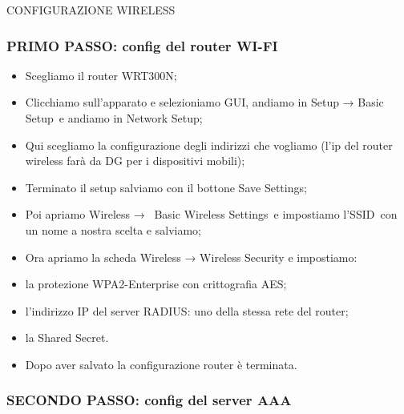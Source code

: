 \documentclass[
]{article}
\providecommand{\tightlist}{%
  \setlength{\itemsep}{0pt}\setlength{\parskip}{0pt}}
\begin{document}
{}

{}

{}

{CONFIGURAZIONE WIRELESS}

{}

{}

\subsubsection{\texorpdfstring{{PRIMO PASSO: config del router
WI-FI}}{PRIMO PASSO: config del router WI-FI}}\label{h.tyjcwt}

{}

\begin{itemize}
\tightlist
\item
  {Scegliamo il router WRT300N;}
\item
  {Clicchiamo sull'apparato e }{selezioniamo GUI}{, andiamo in }{Setup →
  Basic Setup}{~e andiamo in }{Network Setup}{;}
\item
  {Qui scegliamo la configurazione degli indirizzi che vogliamo (l'ip
  del router wireless farà da DG per i dispositivi mobili);}
\item
  {Terminato il setup salviamo con il bottone }{Save Settings}{;}
\item
  {Poi apriamo }{Wireless → ~Basic Wireless Settings}{~e }{impostiamo
  l'SSID}{~con un nome a nostra scelta e salviamo;}
\item
  {Ora apriamo la scheda }{Wireless → Wireless Security }{e impostiamo:}
\end{itemize}

\begin{itemize}
\tightlist
\item
  {la protezione }{WPA2-Enterprise }{con crittografia AES;}
\item
  {l'indirizzo IP del server RADIUS: uno della stessa rete del router;}
\item
  {la Shared Secret.}
\end{itemize}

\begin{itemize}
\tightlist
\item
  {Dopo aver salvato la configurazione router è terminata.}
\end{itemize}

{}

{}

\subsubsection{\texorpdfstring{{SECONDO PASSO: config del server
AAA}}{SECONDO PASSO: config del server AAA}}\label{h.3dy6vkm}
\end{document}
